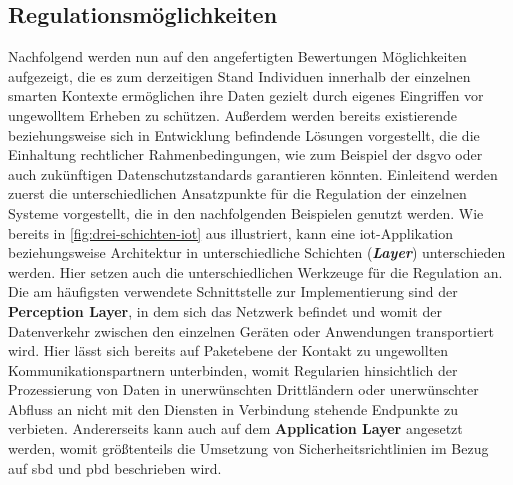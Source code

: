 \subsection{Regulationsmöglichkeiten}
\label{sec:Hauptteil:ssec:Regulationsmöglichkeiten}
Nachfolgend werden nun auf den angefertigten Bewertungen Möglichkeiten aufgezeigt, die es zum derzeitigen Stand Individuen innerhalb der einzelnen smarten Kontexte ermöglichen ihre Daten gezielt durch eigenes Eingriffen vor ungewolltem Erheben zu schützen. Außerdem werden bereits existierende beziehungsweise sich in Entwicklung befindende Lösungen vorgestellt, die die Einhaltung rechtlicher Rahmenbedingungen, wie zum Beispiel der \ac{dsgvo} oder auch zukünftigen Datenschutzstandards garantieren könnten.
Einleitend werden zuerst die unterschiedlichen Ansatzpunkte für die Regulation der einzelnen Systeme vorgestellt, die in den nachfolgenden Beispielen genutzt werden.
Wie bereits in \ref{fig:drei-schichten-iot} aus  illustriert, kann eine \ac{iot}-Applikation beziehungsweise Architektur in unterschiedliche Schichten (\textbf{\textit{Layer}}) unterschieden werden. Hier setzen auch die unterschiedlichen Werkzeuge für die Regulation an. Die am häufigsten verwendete Schnittstelle zur Implementierung sind der \textbf{Perception Layer}, in dem sich das Netzwerk befindet und womit der Datenverkehr zwischen den einzelnen Geräten oder Anwendungen transportiert wird. Hier lässt sich bereits auf Paketebene der Kontakt zu ungewollten Kommunikationspartnern unterbinden, womit Regularien hinsichtlich der Prozessierung von Daten in unerwünschten Drittländern oder unerwünschter Abfluss an nicht mit den Diensten in Verbindung stehende Endpunkte zu verbieten. Andererseits kann auch auf dem \textbf{Application Layer} angesetzt werden, womit größtenteils die Umsetzung von Sicherheitsrichtlinien im Bezug auf \ac{sbd} und \ac{pbd} beschrieben wird.\\



